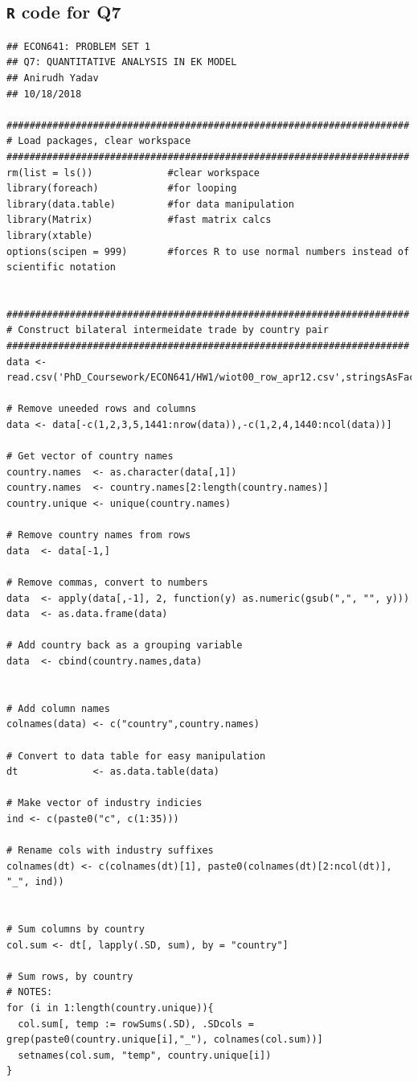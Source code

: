 \documentclass[12pt]{article}
\begin{document}
\subsection{\texttt{R} code for Q7}
\begin{verbatim}
## ECON641: PROBLEM SET 1
## Q7: QUANTITATIVE ANALYSIS IN EK MODEL
## Anirudh Yadav 
## 10/18/2018

######################################################################
# Load packages, clear workspace
######################################################################
rm(list = ls())             #clear workspace
library(foreach)            #for looping
library(data.table)         #for data manipulation
library(Matrix)             #fast matrix calcs
library(xtable)
options(scipen = 999)       #forces R to use normal numbers instead of scientific notation


######################################################################
# Construct bilateral intermeidate trade by country pair
######################################################################
data <- read.csv('PhD_Coursework/ECON641/HW1/wiot00_row_apr12.csv',stringsAsFactors=FALSE)

# Remove uneeded rows and columns
data <- data[-c(1,2,3,5,1441:nrow(data)),-c(1,2,4,1440:ncol(data))]

# Get vector of country names
country.names  <- as.character(data[,1])
country.names  <- country.names[2:length(country.names)]
country.unique <- unique(country.names)

# Remove country names from rows
data  <- data[-1,]

# Remove commas, convert to numbers
data  <- apply(data[,-1], 2, function(y) as.numeric(gsub(",", "", y)))
data  <- as.data.frame(data)

# Add country back as a grouping variable
data  <- cbind(country.names,data)


# Add column names
colnames(data) <- c("country",country.names)

# Convert to data table for easy manipulation
dt             <- as.data.table(data)

# Make vector of industry indicies
ind <- c(paste0("c", c(1:35)))

# Rename cols with industry suffixes 
colnames(dt) <- c(colnames(dt)[1], paste0(colnames(dt)[2:ncol(dt)], "_", ind))


# Sum columns by country
col.sum <- dt[, lapply(.SD, sum), by = "country"]

# Sum rows, by country
# NOTES:
for (i in 1:length(country.unique)){
  col.sum[, temp := rowSums(.SD), .SDcols = grep(paste0(country.unique[i],"_"), colnames(col.sum))]
  setnames(col.sum, "temp", country.unique[i])
}



\end{verbatim}
\end{document}
